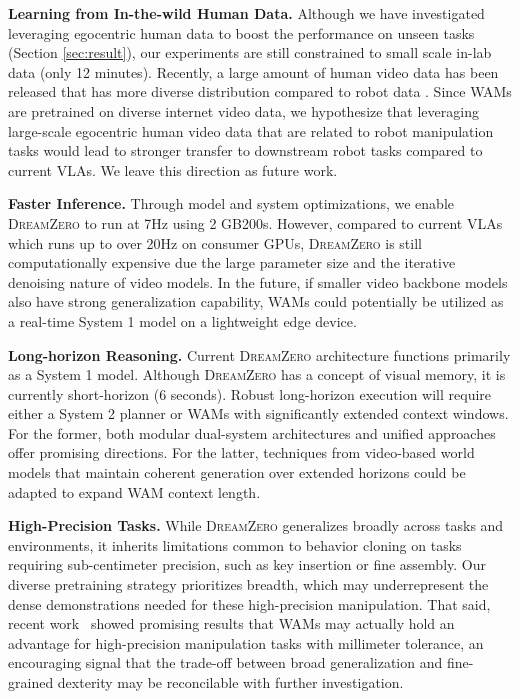 \documentclass[10pt,logo,copyright]{nvidiatechreport}
\newcommand{\ourmethod}{\mbox{\textsc{DreamZero}}\xspace}
\begin{document}
\textbf{Learning from In-the-wild Human Data.} Although we have investigated leveraging egocentric human data to boost the performance on unseen tasks (Section \ref{sec:result}), our experiments are still constrained to small scale in-lab data (only 12 minutes). Recently, a large amount of human video data has been released that has more diverse distribution compared to robot data \citep{grauman2022ego4d, hoque2025egodex, chen2026action100m}. Since WAMs are pretrained on diverse internet video data, we hypothesize that leveraging large-scale egocentric human video data that are related to robot manipulation tasks would lead to stronger transfer to downstream robot tasks compared to current VLAs. We leave this direction as future work.

\textbf{Faster Inference.} Through model and system optimizations, we enable \ourmethod to run at 7Hz using 2 GB200s. However, compared to current VLAs which runs up to over 20Hz on consumer GPUs, \ourmethod is still computationally expensive due the large parameter size and the iterative denoising nature of video models. In the future, if smaller video backbone models also have strong generalization capability, WAMs could potentially be utilized as a real-time System 1 model on a lightweight edge device.

\textbf{Long-horizon Reasoning.} Current \ourmethod architecture functions primarily as a System 1 model. Although \ourmethod has a concept of visual memory, it is currently short-horizon (6 seconds). Robust long-horizon execution will require either a System 2 planner or WAMs with significantly extended context windows. For the former, both modular dual-system architectures \citep{shi2025hi} and unified approaches \citep{deng2025emerging} offer promising directions. For the latter, techniques from video-based world models that maintain coherent generation over extended horizons \citep{genie3, hyworld2025} could be adapted to expand WAM context length.

\textbf{High-Precision Tasks.} While \ourmethod generalizes broadly across tasks and environments, it inherits limitations common to behavior cloning on tasks requiring sub-centimeter precision, such as key insertion or fine assembly. Our diverse pretraining strategy prioritizes breadth, which may underrepresent the dense demonstrations needed for these high-precision manipulation. That said, recent work~\citep{kim2026cosmos} showed promising results that WAMs may actually hold an advantage for high-precision manipulation tasks with millimeter tolerance, an encouraging signal that the trade-off between broad generalization and fine-grained dexterity may be reconcilable with further investigation.
\end{document}
